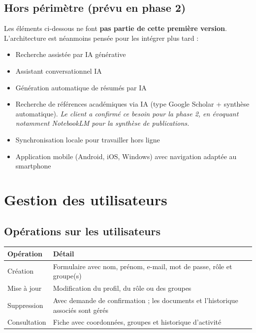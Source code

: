 \documentclass[a4paper,12pt,french]{article}
\begin{document}
\subsection{Hors périmètre (prévu en phase 2)}

Les éléments ci-dessous ne font \textbf{pas partie de cette première version}. L'architecture est néanmoins pensée pour les intégrer plus tard :

\begin{itemize}[leftmargin=1.5em]
  \item Recherche assistée par IA générative
  \item Assistant conversationnel IA
  \item Génération automatique de résumés par IA
  \item Recherche de références académiques via IA (type Google Scholar + synthèse automatique). \textit{Le client a confirmé ce besoin pour la phase 2, en évoquant notamment NotebookLM pour la synthèse de publications.}
  \item Synchronisation locale pour travailler hors ligne
  \item Application mobile (Android, iOS, Windows) avec navigation adaptée au smartphone
\end{itemize}


\section{Gestion des utilisateurs}

\subsection{Opérations sur les utilisateurs}

\begin{tabularx}{\textwidth}{l X}
\toprule
\textbf{Opération} & \textbf{Détail} \\
\midrule
Création & Formulaire avec nom, prénom, e-mail, mot de passe, rôle et groupe(s) \\
\addlinespace
Mise à jour & Modification du profil, du rôle ou des groupes \\
\addlinespace
Suppression & Avec demande de confirmation ; les documents et l'historique associés sont gérés \\
\addlinespace
Consultation & Fiche avec coordonnées, groupes et historique d'activité \\
\bottomrule
\end{tabularx}
\end{document}
